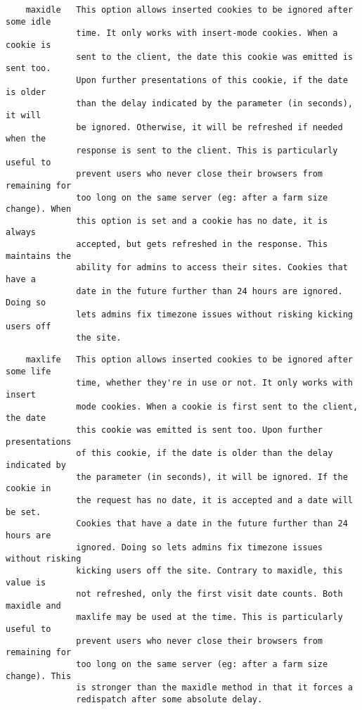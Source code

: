 \begin{verbatim}
    maxidle   This option allows inserted cookies to be ignored after some idle
              time. It only works with insert-mode cookies. When a cookie is
              sent to the client, the date this cookie was emitted is sent too.
              Upon further presentations of this cookie, if the date is older
              than the delay indicated by the parameter (in seconds), it will
              be ignored. Otherwise, it will be refreshed if needed when the
              response is sent to the client. This is particularly useful to
              prevent users who never close their browsers from remaining for
              too long on the same server (eg: after a farm size change). When
              this option is set and a cookie has no date, it is always
              accepted, but gets refreshed in the response. This maintains the
              ability for admins to access their sites. Cookies that have a
              date in the future further than 24 hours are ignored. Doing so
              lets admins fix timezone issues without risking kicking users off
              the site.
\end{verbatim}

\begin{verbatim}
    maxlife   This option allows inserted cookies to be ignored after some life
              time, whether they're in use or not. It only works with insert
              mode cookies. When a cookie is first sent to the client, the date
              this cookie was emitted is sent too. Upon further presentations
              of this cookie, if the date is older than the delay indicated by
              the parameter (in seconds), it will be ignored. If the cookie in
              the request has no date, it is accepted and a date will be set.
              Cookies that have a date in the future further than 24 hours are
              ignored. Doing so lets admins fix timezone issues without risking
              kicking users off the site. Contrary to maxidle, this value is
              not refreshed, only the first visit date counts. Both maxidle and
              maxlife may be used at the time. This is particularly useful to
              prevent users who never close their browsers from remaining for
              too long on the same server (eg: after a farm size change). This
              is stronger than the maxidle method in that it forces a
              redispatch after some absolute delay.
\end{verbatim}


